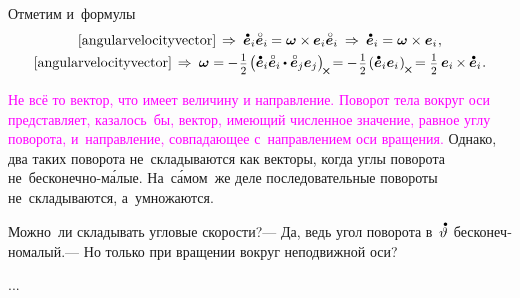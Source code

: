 \begin{otherlanguage}{russian}
\vspace{-0.25em}
Отметим и~формулы
\nopagebreak\vspace{.16em}\begin{equation}\label{angularvelocityandbasisvectors}
\begin{array}{c}
\eqref{angularvelocityvector} \hspace{.32ex} \Rightarrow\:
\mathdotabove{\bm{e}}_i \mathcircabove{\bm{e}}_i \hspace{-0.1ex} = \bm{\omega} \times \hspace{-0.1ex} \bm{e}_i \mathcircabove{\bm{e}}_i \:\Rightarrow\:
\mathdotabove{\bm{e}}_i = \bm{\omega} \times \bm{e}_i \hspace{.12ex},
\\[.32em]
%
\eqref{angularvelocityvector} \hspace{.32ex} \Rightarrow\:
\bm{\omega} = \hspace{-0.1ex} - \hspace{.16ex} \smalldisplaystyleonehalf \hspace{-.2ex} \left( \mathdotabove{\bm{e}}_i \mathcircabove{\bm{e}}_i \hspace{-0.1ex} \dotp \mathcircabove{\bm{e}}_j \bm{e}_j \right)_{\hspace{-0.25ex}\Xcompanion} \hspace{-0.32ex}
= \hspace{-0.1ex} - \hspace{.16ex} \smalldisplaystyleonehalf \hspace{-.2ex} \left( \mathdotabove{\bm{e}}_i \bm{e}_i \hspace{.1ex} \right)_{\hspace{-0.1ex}\Xcompanion} \hspace{-0.25ex}
= \smalldisplaystyleonehalf \hspace{.4ex} \bm{e}_i \hspace{-0.16ex} \times \hspace{-0.1ex} \mathdotabove{\bm{e}}_i
\hspace{.12ex} .
\end{array}
\end{equation}



\textcolor{magenta}{Не всё то вектор, что имеет величину и направление. Поворот тела вокруг оси представляет, казалось~бы, вектор, имеющий численное значение, равное углу поворота, и~направление, совпадающее с~направлением оси вращения.} Однако, два таких поворота не~складываются как векторы, когда углы поворота не~бесконечно-м\'{а}лые. На~с\'{а}мом~же деле последовательные повороты не~складываются, а~умножаются.

Можно~ли складывать угловые скорости?\:--- Да, ведь угол поворота в~$\mathdotabove{\vartheta}$ бесконечномалый.\:--- Но только при вращении вокруг неподвижной оси?

...



\end{otherlanguage}

